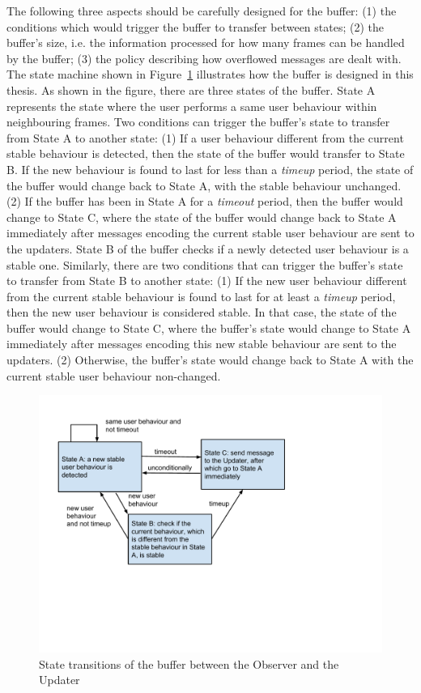 The following three aspects should be carefully designed for the buffer: (1) the conditions which would trigger the buffer to transfer between states; (2) the buffer's size, i.e. the information processed for how many frames can be handled by the buffer; (3) the policy describing how overflowed messages are dealt with. The state machine shown in Figure~\ref{fig:state-trans} illustrates how the buffer is designed in this thesis. As shown in the figure, there are three states of the buffer. State A represents the state where the user performs a same user behaviour within neighbouring frames. Two conditions can trigger the buffer's state to transfer from State A to another state: (1) If a user behaviour different from the current stable behaviour is detected, then the state of the buffer would transfer to State B. If the new behaviour is found to last for less than a \textit{timeup} period, the state of the buffer would change back to State A, with the stable behaviour unchanged. (2) If the buffer has been in State A for a \textit{timeout} period, then the buffer would change to State C, where the state of the buffer would change back to State A immediately after messages encoding the current stable user behaviour are sent to the updaters. State B of the buffer checks if a newly detected user behaviour is a stable one. Similarly, there are two conditions that can trigger the buffer's state to transfer from State B to another state: (1) If the new user behaviour different from the current stable behaviour is found to last for at least a \textit{timeup} period, then the new user behaviour is considered stable. In that case, the state of the buffer would change to State C, where the buffer's state would change to State A immediately after messages encoding this new stable behaviour are sent to the updaters. (2) Otherwise, the buffer's state would change back to State A with the current stable user behaviour non-changed.

\begin{figure}[H]
\centering
\includegraphics[trim = 10mm 60mm 50mm 17mm, clip, width=.85\linewidth]{fig/fig-state-trans.pdf}
\caption{State transitions of the buffer between the Observer and the Updater}
\label{fig:state-trans}
\end{figure}
 

